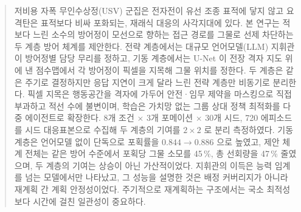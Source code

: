 \begin{abstract}
\noindent
저비용 자폭 무인수상정(USV) 군집은 전자전이 유선 조종 표적에 닿지 않고 요격탄은 표적보다
비싸 포화되는, 재래식 대응의 사각지대에 있다. 본 연구는 적보다 느린 소수의 방어정이 모선으로
향하는 접근 경로를 그물로 선제 차단하는 두 계층 방어 체계를 제안한다. 전략 계층에서는 대규모
언어모델(LLM) 지휘관이 방어정별 담당 무리를 정하고, 기동 계층에서는 U-Net 이 전장 격자
지도 위에 낸 점수맵에서 각 방어정이 픽셀을 지목해 그물 위치를 정한다. 두 계층은 같은
주기로 결정하지만 응답 지연이 크게 달라 느린 전략 계층만 비동기로 분리한다. 픽셀 지목은
행동공간을 격자에 가두어 안전·임무 제약을 마스킹으로 직접 부과하고 적선 수에 불변이며,
학습은 가치망 없는 그룹 상대 정책 최적화를 다중 에이전트로 확장한다. 8개 조건 $\times$ 3개
포메이션 $\times$ 30개 시드, 720 에피소드를 시드 대응표본으로 수집해 두 계층의 기여를
$2\times2$ 로 분리 측정하였다. 기동 계층은 언어모델 없이 단독으로 포획률을
$0.844 \to 0.886$ 으로 높였고, 제안 체계 전체는 같은 방어 수준에서 포획당 그물 소모를
45\,\%, 총 선회량을 47\,\% 줄였으며, 두 계층의 기여는 상승이 아닌 가산적이었다.
지휘관의 이득은 능력 임계를 넘는 모델에서만 나타났고, 그 성능을 설명한 것은 배정
커버리지가 아니라 재계획 간 계획 안정성이었다. 주기적으로 재계획하는 구조에서는 국소
최적성보다 시간에 걸친 일관성이 중요하다.
\end{abstract}

